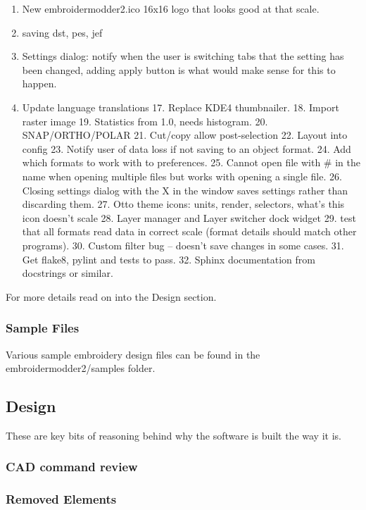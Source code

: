 \documentclass[a4paper, 11pt]{report}
\begin{document}
\begin{enumerate}
\item New embroidermodder2.ico 16x16 logo that looks good at that scale.
\item saving dst, pes, jef
\item Settings dialog: notify when the user is switching tabs that the setting has been changed, adding apply button is what would make sense for this to happen.
\item Update language translations
17. Replace KDE4 thumbnailer.
18. Import raster image
19. Statistics from 1.0, needs histogram.
20. SNAP/ORTHO/POLAR
21. Cut/copy allow post-selection
22. Layout into config
23. Notify user of data loss if not saving to an object format.
24. Add which formats to work with to preferences.
25. Cannot open file with \# in the name when opening multiple files but works with opening a single file.
26. Closing settings dialog with the X in the window saves settings rather than discarding them.
27. Otto theme icons: units, render, selectors, what's this icon doesn't scale
28. Layer manager and Layer switcher dock widget
29. test that all formats read data in correct scale (format details should match other programs).
30. Custom filter bug -- doesn't save changes in some cases.
31. Get flake8, pylint and tests to pass.
32. Sphinx documentation from docstrings or similar.
\end{enumerate}

For more details read on into the Design section.

\subsubsection{Sample Files}

Various sample embroidery design files can be found in the embroidermodder2/samples folder.

\subsection{Design}

These are key bits of reasoning behind why the software is built the way it is.

\subsubsection{CAD command review}



\subsubsection{Removed Elements}
\end{document}
